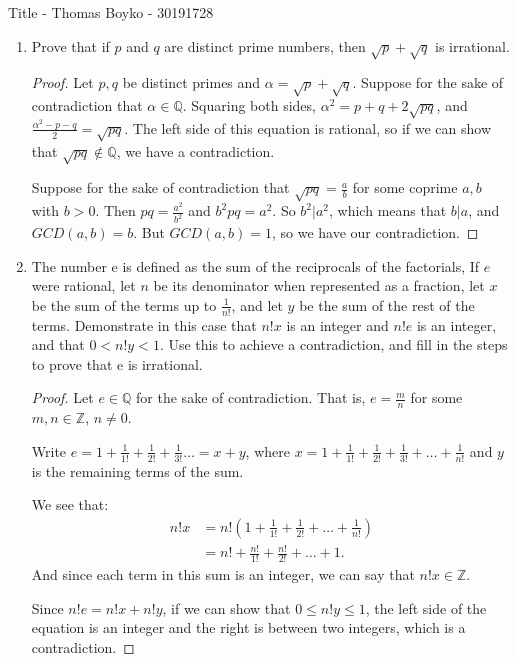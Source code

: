 \documentclass{article}
\begin{document}
    \huge Title - Thomas Boyko - 30191728
    \normalsize
\begin{enumerate} 
    \item Prove that if $p$ and $q$ are distinct prime numbers, then 
        $\sqrt{p} +\sqrt{q}$ is irrational.
        \begin{proof} 
            Let $p,q$ be distinct primes and $\alpha=\sqrt{p} +\sqrt{q} $. Suppose for the sake
            of contradiction that $\alpha\in \mathbb{Q}$. Squaring both sides,
            $\alpha^2=p+q+2\sqrt{pq} $, and $\frac{\alpha^2-p-q}{2}=\sqrt{pq}$.
            The left side of this equation is rational, so if we can show that $\sqrt{pq} \not\in 
            \mathbb{Q}$, we have a contradiction.

            Suppose for the sake of contradiction that $\sqrt{pq} =\frac{a}{b}$ for some coprime $a,b$ with $b>0$.
            Then $pq=\frac{a^2}{b^2}$ and $b^2pq=a^2$. So $b^2|a^2$, which means that $b|a$, and $GCD(a,b)=b$. But 
            $GCD(a,b)=1$, so we have our contradiction.
        \end{proof}
    \item The number e is defined as the sum of the reciprocals of the factorials, If $e$ were rational, let $n$ be its denominator when represented as a fraction, let $x$ be the sum of the terms up to $\frac{1}{n!}$,
and let $y$ be the sum of the rest of the terms. Demonstrate in
this case that $n! x$ is an integer and $n! e$ is an integer, and that
$0 < n!  y < 1$. Use this to achieve a contradiction, and fill in the
steps to prove that e is irrational. 
\begin{proof} 
    Let $e\in \mathbb{Q}$ for the sake of contradiction. That is, 
    $e=\frac{m}{n}$ for some $m,n\in \mathbb{Z}$, $n\neq 0$.
    
    Write $e=1+\frac{1}{1!}+\frac{1}{2!}+\frac{1}{3!}\ldots=x+y$, where 
    $x=1+\frac{1}{1!}+\frac{1}{2!}+\frac{1}{3!}+\ldots +\frac{1}{n!}$ and 
    $y$ is the remaining terms of the sum.

    We see that: 
    \begin{align*}
        n!x&= n!\left(1+\frac{1}{1!}+\frac{1}{2!}+\ldots+ \frac{1}{n!}\right) \\
        &= n!+ \frac{n!}{1!} +\frac{n!}{2!}+\ldots +1 
    .\end{align*}
    And since each term in this sum is an integer, we can say that 
    $n!x\in \mathbb{Z}$.

    Since $n!e=n!x+n!y$, if we can show that $0\le n!y\le 1$, the left side of 
    the equation is an integer and the right is between two integers, which is  
    a contradiction.


\end{proof}
\end{enumerate}
\end{document}

